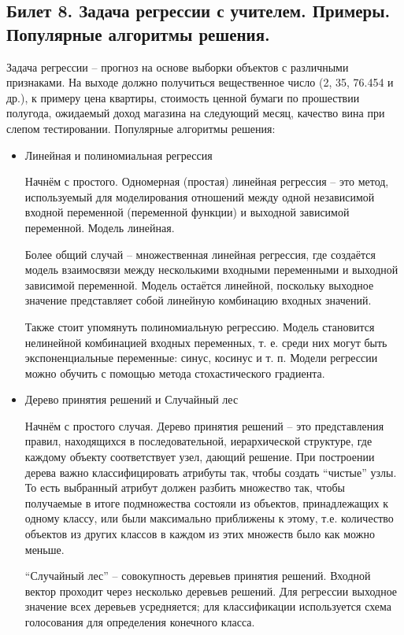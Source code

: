 \documentclass[a4paper, 12pt]{article}
\begin{document}
	\subsection*{Билет 8. Задача регрессии с учителем. Примеры. Популярные алгоритмы решения.}
	Задача регрессии – прогноз на основе выборки объектов с различными признаками. На выходе должно получиться вещественное число (2, 35, 76.454 и др.), к примеру цена квартиры, стоимость ценной бумаги по прошествии полугода, ожидаемый доход магазина на следующий месяц, качество вина при слепом тестировании. Популярные алгоритмы решения:
	\begin{itemize}
		\item Линейная и полиномиальная регрессия
		
		Начнём с простого. Одномерная (простая) линейная регрессия – это метод, используемый для моделирования отношений между одной независимой входной переменной (переменной функции) и выходной зависимой переменной. Модель линейная.
		
		Более общий случай – множественная линейная регрессия, где создаётся модель взаимосвязи между несколькими входными переменными и выходной зависимой переменной. Модель остаётся линейной, поскольку выходное значение представляет собой линейную комбинацию входных значений.
		
		Также стоит упомянуть полиномиальную регрессию. Модель становится нелинейной комбинацией входных переменных, т. е. среди них могут быть экспоненциальные переменные: синус, косинус и т. п. Модели регрессии можно обучить с помощью метода стохастического градиента.
		
		\item Дерево принятия решений и Случайный лес
		
		Начнём с простого случая. Дерево принятия решений – это представления правил, находящихся в последовательной, иерархической структуре, где каждому объекту соответствует узел, дающий решение. При построении дерева важно классифицировать атрибуты так, чтобы создать “чистые” узлы. То есть выбранный атрибут должен разбить множество так, чтобы получаемые в итоге подмножества состояли из объектов, принадлежащих к одному классу, или были максимально приближены к этому, т.е. количество объектов из других классов в каждом из этих множеств было как можно меньше.
		
		“Случайный лес” – совокупность деревьев принятия решений. Входной вектор проходит через несколько деревьев решений. Для регрессии выходное значение всех деревьев усредняется; для классификации используется схема голосования для определения конечного класса.
		

\end{itemize}
\end{document}

